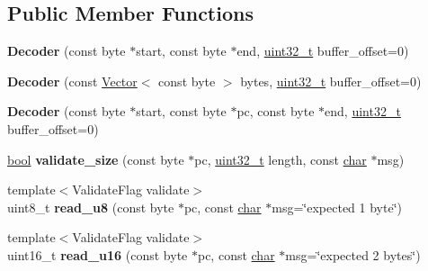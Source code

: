 \subsection*{Public Member Functions}
\begin{DoxyCompactItemize}
\item 
\mbox{\label{classv8_1_1internal_1_1wasm_1_1Decoder_ae5b1fff7a1695c26cca99a72b94f4bd9}} 
{\bfseries Decoder} (const byte $\ast$start, const byte $\ast$end, \mbox{\hyperlink{classuint32__t}{uint32\+\_\+t}} buffer\+\_\+offset=0)
\item 
\mbox{\label{classv8_1_1internal_1_1wasm_1_1Decoder_a3b22985094c0dbd7b5580ba1c4623f75}} 
{\bfseries Decoder} (const \mbox{\hyperlink{classv8_1_1internal_1_1Vector}{Vector}}$<$ const byte $>$ bytes, \mbox{\hyperlink{classuint32__t}{uint32\+\_\+t}} buffer\+\_\+offset=0)
\item 
\mbox{\label{classv8_1_1internal_1_1wasm_1_1Decoder_ae763d02c36b70d008e028444fa3cfc07}} 
{\bfseries Decoder} (const byte $\ast$start, const byte $\ast$pc, const byte $\ast$end, \mbox{\hyperlink{classuint32__t}{uint32\+\_\+t}} buffer\+\_\+offset=0)
\item 
\mbox{\label{classv8_1_1internal_1_1wasm_1_1Decoder_a31655b091c503accd0391441f2567e2b}} 
\mbox{\hyperlink{classbool}{bool}} {\bfseries validate\+\_\+size} (const byte $\ast$pc, \mbox{\hyperlink{classuint32__t}{uint32\+\_\+t}} length, const \mbox{\hyperlink{classchar}{char}} $\ast$msg)
\item 
\mbox{\label{classv8_1_1internal_1_1wasm_1_1Decoder_af6972012e7bf6bdf0d07f74c913df2d4}} 
{\footnotesize template$<$Validate\+Flag validate$>$ }\\uint8\+\_\+t {\bfseries read\+\_\+u8} (const byte $\ast$pc, const \mbox{\hyperlink{classchar}{char}} $\ast$msg=\char`\"{}expected 1 byte\char`\"{})
\item 
\mbox{\label{classv8_1_1internal_1_1wasm_1_1Decoder_a95794a503474376fed4f147b92b53481}} 
{\footnotesize template$<$Validate\+Flag validate$>$ }\\uint16\+\_\+t {\bfseries read\+\_\+u16} (const byte $\ast$pc, const \mbox{\hyperlink{classchar}{char}} $\ast$msg=\char`\"{}expected 2 bytes\char`\"{})

\end{DoxyCompactItemize}
